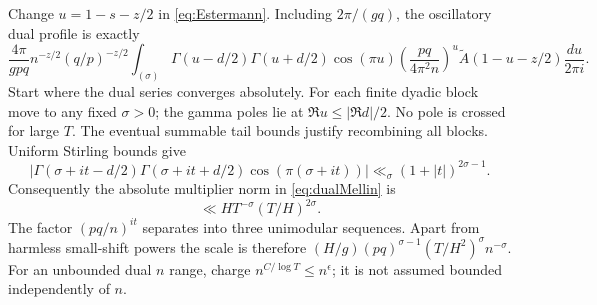 \documentclass[11pt]{article}
\theoremstyle{remark}
\begin{document}
Change $u=1-s-z/2$ in \eqref{eq:Estermann}. Including $2\pi/(gq)$,
the oscillatory dual profile is exactly
\begin{equation}\label{eq:dualMellin}
 \frac{4\pi}{gpq}n^{-z/2}(q/p)^{-z/2}
 \int_{(\sigma)}\Gamma(u-d/2)\Gamma(u+d/2)\cos(\pi u)
  \left(\frac{pq}{4\pi^2n}\right)^u
  \widetilde A(1-u-z/2)\frac{du}{2\pi i}.
\end{equation}
Start where the dual series converges absolutely. For each finite dyadic
block move to any fixed $\sigma>0$; the gamma poles lie at
$\Re u\le|\Re d|/2$. No pole is crossed for large $T$.
The eventual summable tail bounds justify recombining all blocks.
Uniform Stirling bounds give
\[
 |\Gamma(\sigma+it-d/2)\Gamma(\sigma+it+d/2)\cos(\pi(\sigma+it))|
       \ll_\sigma(1+|t|)^{2\sigma-1}.
\]
Consequently the absolute multiplier norm in \eqref{eq:dualMellin} is
\begin{equation}\label{eq:multipliernorm}
 \ll H T^{-\sigma}(T/H)^{2\sigma}.
\end{equation}
The factor $(pq/n)^{it}$ separates into three unimodular sequences.
Apart from harmless small-shift powers the scale is therefore
$(H/g)(pq)^{\sigma-1}(T/H^2)^\sigma n^{-\sigma}$.
For an unbounded dual $n$ range, charge $n^{C/\log T}\le n^\epsilon$;
it is not assumed bounded independently of $n$.
\end{document}
